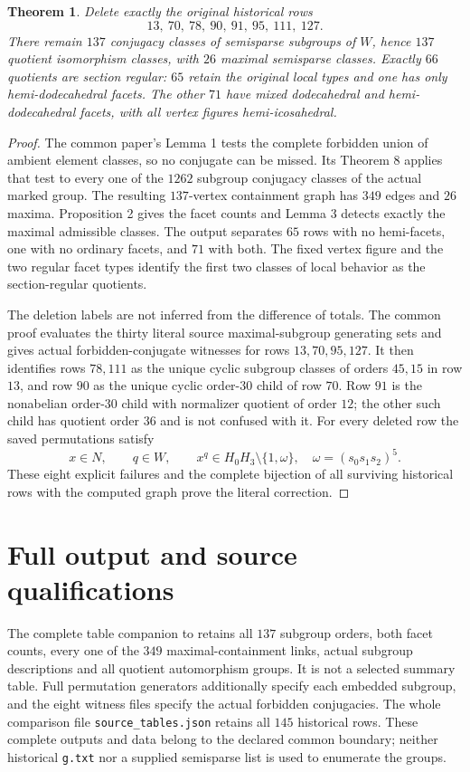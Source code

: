 \documentclass[11pt,a4paper]{article}
\newtheorem{theorem}{Theorem}\newtheorem{lemma}[theorem]{Lemma}
\begin{document}
\begin{theorem}\label{erratum}
Delete exactly the original historical rows
\[
13,\ 70,\ 78,\ 90,\ 91,\ 95,\ 111,\ 127.
\]
There remain $137$ conjugacy classes of semisparse subgroups of $W$, hence $137$ quotient isomorphism classes, with $26$ maximal semisparse classes. Exactly $66$ quotients are section regular: $65$ retain the original local types and one has only hemi-dodecahedral facets. The other $71$ have mixed dodecahedral and hemi-dodecahedral facets, with all vertex figures hemi-icosahedral.
\end{theorem}
\begin{proof}
The common paper's Lemma 1 tests the complete forbidden union of ambient element classes, so no conjugate can be missed. Its Theorem 8 applies that test to every one of the $1262$ subgroup conjugacy classes of the actual marked group. The resulting $137$-vertex containment graph has $349$ edges and $26$ maxima. Proposition 2 gives the facet counts and Lemma 3 detects exactly the maximal admissible classes. The output separates $65$ rows with no hemi-facets, one with no ordinary facets, and $71$ with both. The fixed vertex figure and the two regular facet types identify the first two classes of local behavior as the section-regular quotients.

The deletion labels are not inferred from the difference of totals. The common proof evaluates the thirty literal source maximal-subgroup generating sets and gives actual forbidden-conjugate witnesses for rows $13,70,95,127$. It then identifies rows $78,111$ as the unique cyclic subgroup classes of orders $45,15$ in row $13$, and row $90$ as the unique cyclic order-$30$ child of row $70$. Row $91$ is the nonabelian order-$30$ child with normalizer quotient of order $12$; the other such child has quotient order $36$ and is not confused with it. For every deleted row the saved permutations satisfy
\[
 x\in N,\qquad q\in W,\qquad x^q\in H_0H_3\setminus\{1,\omega\},
 \quad \omega=(s_0s_1s_2)^5.
\]
These eight explicit failures and the complete bijection of all surviving historical rows with the computed graph prove the literal correction.
\end{proof}

\section{Full output and source qualifications}
The complete table companion to \cite{common} retains all $137$ subgroup orders, both facet counts, every one of the $349$ maximal-containment links, actual subgroup descriptions and all quotient automorphism groups. It is not a selected summary table. Full permutation generators additionally specify each embedded subgroup, and the eight witness files specify the actual forbidden conjugacies. The whole comparison file \texttt{source\_tables.json} retains all $145$ historical rows. These complete outputs and data belong to the declared common boundary; neither historical \texttt{g.txt} nor a supplied semisparse list is used to enumerate the groups.
\end{document}
